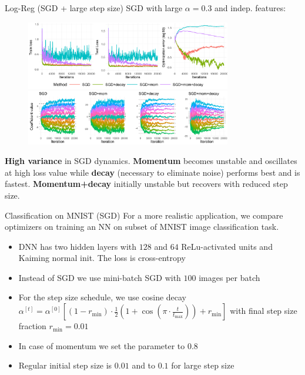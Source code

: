\documentclass[11pt,compress,t,notes=noshow, xcolor=table]{beamer}
\begin{document}
\begin{vbframe}{Log-Reg (SGD + large step size)}
\vspace{-0.4cm}
SGD with large $\alpha=0.3$ and indep. features:
\begin{figure}
            \includegraphics[width=0.8\textwidth]{slides/04-multivariate-first-order/figure_man/simu_linmod/SGD_log_large_lr_iters.pdf} \\
             \includegraphics[width=0.8\textwidth]{slides/04-multivariate-first-order/figure_man/simu_linmod/SGD_log_coef_large.pdf}\\
            \begin{footnotesize}
            \end{footnotesize}
\end{figure}
{\footnotesize
\textbf{High variance} in SGD dynamics. \textbf{Momentum} becomes unstable and oscillates at high loss value while \textbf{decay} (necessary to eliminate noise) performs best and is fastest. \textbf{Momentum+decay} initially unstable but recovers with reduced step size.}
\end{vbframe}


\begin{vbframe}{Classification on MNIST (SGD)}
For a more realistic application, we compare optimizers on training an NN on subset of MNIST image classification task. 
\medskip
\begin{itemize}
     \setlength{\itemsep}{1.2em} 
    \item DNN has two hidden layers with $128$ and $64$ ReLu-activated units and Kaiming normal init. The loss is cross-entropy
    \item Instead of SGD we use mini-batch SGD with $100$ images per batch
    \item For the step size schedule, we use cosine decay $\alpha^{[t]} = \alpha^{[0]} \left[(1-r_{\text{min}}) \cdot \frac{1}{2}\left(1 + \cos\left(\pi \cdot \frac{t}{t_{\text{max}}}\right)\right) + r_{\text{min}}\right]$ with final step size fraction $r_{\text{min}}=0.01$
    \item In case of momentum we set the parameter to $0.8$
    \item Regular initial step size is $0.01$ and to $0.1$ for large step size
\end{itemize}
\end{vbframe}
\end{document}
